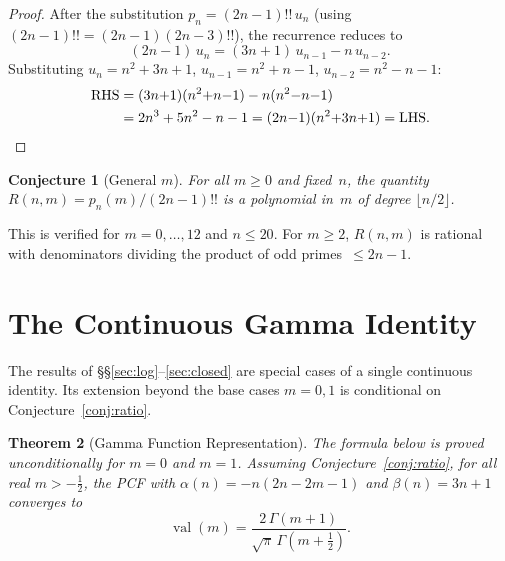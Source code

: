 \documentclass[11pt,a4paper]{article}
\theoremstyle{plain}
\newtheorem{theorem}{Theorem}[section]
\newtheorem{conjecture}[theorem]{Conjecture}
\theoremstyle{definition}
\theoremstyle{remark}
\newcommand{\half}{\tfrac{1}{2}}
\newcommand{\dff}[1]{(#1)!!}
\begin{document}
\begin{proof}
After the substitution $p_n = \dff{2n{-}1}\,u_n$
(using $\dff{2n{-}1} = (2n{-}1)\dff{2n{-}3}$),
the recurrence reduces to
\begin{equation}\label{eq:ured}
  (2n{-}1)\,u_n = (3n{+}1)\,u_{n-1} - n\,u_{n-2}.
\end{equation}
Substituting $u_n = n^2{+}3n{+}1$, $u_{n-1} = n^2{+}n{-}1$,
$u_{n-2} = n^2{-}n{-}1$:
\begin{align*}
  \text{RHS} &= (3n{+}1)(n^2{+}n{-}1) - n(n^2{-}n{-}1) \\
  &= 2n^3 + 5n^2 - n - 1
   = (2n{-}1)(n^2{+}3n{+}1) = \text{LHS.}\qedhere
\end{align*}
\end{proof}

\begin{conjecture}[General $m$]\label{conj:Rnm}
For all $m \ge 0$ and fixed~$n$, the quantity
$R(n,m) = p_n(m)/\dff{2n{-}1}$
is a polynomial in~$m$ of degree $\lfloor n/2 \rfloor$.
\end{conjecture}

This is verified for $m = 0, \ldots, 12$ and $n \le 20$.
For $m \ge 2$, $R(n,m)$ is rational with denominators dividing the
product of odd primes~$\le 2n{-}1$.

\section{The Continuous Gamma Identity}\label{sec:gamma}

The results of \S\S\ref{sec:log}--\ref{sec:closed} are special
cases of a single continuous identity. Its extension beyond the
base cases $m=0,1$ is conditional on Conjecture~\ref{conj:ratio}.

\begin{theorem}[Gamma Function Representation]\label{thm:gamma}
The formula below is proved unconditionally for $m=0$ and $m=1$.
Assuming Conjecture~\ref{conj:ratio}, for all real $m > -\frac{1}{2}$,
the PCF with
$\alpha(n) = -n(2n{-}2m{-}1)$ and $\beta(n) = 3n+1$
converges to
\[
  \operatorname{val}(m)
  = \frac{2\,\Gamma(m{+}1)}{\sqrt{\pi}\,\Gamma(m{+}\half)}.
\]
\end{theorem}
\end{document}
